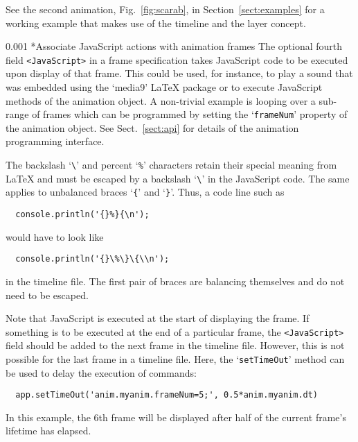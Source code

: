 \documentclass[a4paper]{article}
\makeatletter
\newcommand\myparagraph{\@startsection{paragraph}{3}{\z@}%
                                     {\parskip}%
                                     {0.001\parskip}%
                                     {\itshape\normalsize}}
\makeatother
\begin{document}
%

See the second animation, Fig.~\ref{fig:scarab}, in Section~\ref{sect:examples} for a working example that makes use of the timeline and the layer concept.

\myparagraph*{Associate JavaScript actions with animation frames}\label{sect:jsfield}
The optional fourth field \verb+<JavaScript>+ in a frame specification takes JavaScript code to be executed upon display of that frame. This could be used, for instance, to play a sound that was embedded using the `media9' \LaTeX{} package \cite{media9} or to execute JavaScript methods of the animation object. A non-trivial example is looping over a sub-range of frames which can be programmed by setting the `\verb+frameNum+' property of the animation object. See Sect.~\ref{sect:api} for details of the animation programming interface.

The backslash `\verb+\+' and percent `\verb+%+' characters retain their special meaning from \LaTeX{} and must be escaped by a backslash `\verb+\+' in the JavaScript code. The same applies to unbalanced braces `\verb+{+' and `\verb+}+'. Thus, a code line such as
\begin{verbatim}
  console.println('{}%}{\n');
\end{verbatim}
would have to look like
\begin{verbatim}
  console.println('{}\%\}\{\\n');
\end{verbatim}
in the timeline file. The first pair of braces are balancing themselves and do not need to be escaped.

Note that JavaScript is executed at the start of displaying the frame. If something is to be executed at the end of a particular frame, the \verb+<JavaScript>+ field should be added to the next frame in the timeline file. However, this is not possible for the last frame in a timeline file. Here, the `\verb+setTimeOut+' method can be used to delay the execution of commands:
\begin{verbatim}
  app.setTimeOut('anim.myanim.frameNum=5;', 0.5*anim.myanim.dt)
\end{verbatim}
In this example, the 6th frame will be displayed after half of the current frame's lifetime has elapsed.
\end{document}
